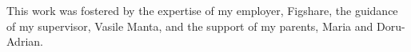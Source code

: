 \thispagestyle{empty}
This work was fostered by the expertise of my employer, Figshare, the guidance of my supervisor, Vasile Manta, and the support of my parents, Maria and Doru-Adrian.